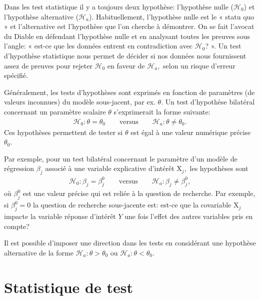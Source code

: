 \documentclass[
  11pt,
  letterpaper,
]{scrbook}
\theoremstyle{plain}
\theoremstyle{plain}
\theoremstyle{definition}
\theoremstyle{definition}
\theoremstyle{remark}
\begin{document}
Dans les test statistique il y a toujours deux hypothèse: l'hypothèse
nulle (\(\mathscr{H}_{0}\)) et l'hypothèse alternative
(\(\mathscr{H}_a\)). Habituellement, l'hypothèse nulle est le « statu
quo » et l'alternative est l'hypothèse que l'on cherche à démontrer. On
se fait l'avocat du Diable en défendant l'hypothèse nulle et en
analysant toutes les preuves sous l'angle: « est-ce que les données
entrent en contradiction avec \(\mathscr{H}_0\)? ». Un test d'hypothèse
statistique nous permet de décider si nos données nous fournissent assez
de preuves pour rejeter \(\mathscr{H}_0\) en faveur de
\(\mathscr{H}_a,\) selon un risque d'erreur spécifié.

Généralement, les tests d'hypothèses sont exprimés en fonction de
paramètres (de valeurs inconnues) du modèle sous-jacent, par ex.
\(\theta.\) Un test d'hypothèse bilatéral concernant un paramètre
scalaire \(\theta\) s'exprimerait la forme suivante: \begin{align*}
\mathscr{H}_0: \theta=\theta_0 \qquad \text{versus} \qquad \mathscr{H}_a:\theta \neq \theta_0.
\end{align*} Ces hypothèses permettent de tester si \(\theta\) est égal
à une valeur numérique précise \(\theta_0.\)

Par exemple, pour un test bilatéral concernant le paramètre d'un modèle
de régression \(\beta_j\) associé à une variable explicative d'intérêt
\(\mathrm{X}_j,\) les hypothèses sont \begin{align*}
\mathscr{H}_0: \beta_j=\beta_j^0 \qquad \text{versus} \qquad \mathscr{H}_a:\beta_j \neq \beta_j^0,
\end{align*} où \(\beta_j^0\) est une valeur précise qui est reliée à la
question de recherche. Par exemple, si \(\beta_j^0=0\) la question de
recherche sous-jacente est: est-ce que la covariable \(\mathrm{X}_j\)
impacte la variable réponse d'intérêt \(Y\) une fois l'effet des autres
variables pris en compte?

Il est possible d'imposer une direction dans les tests en considérant
une hypothèse alternative de la forme
\(\mathscr{H}_a: \theta > \theta_0\) ou
\(\mathscr{H}_a: \theta < \theta_0.\)

\section{Statistique de test}\label{statistique-de-test}
\end{document}
